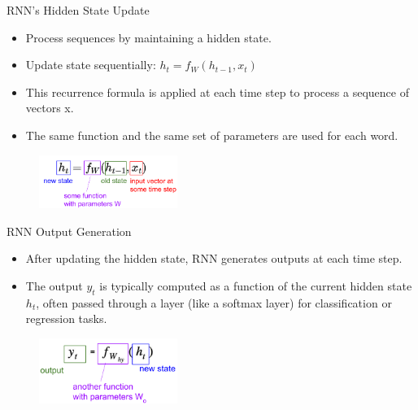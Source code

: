 \documentclass[serif, aspectratio=169]{beamer}
\begin{document}
\begin{frame}{RNN's Hidden State Update}
    \begin{itemize}
        \item Process sequences by maintaining a hidden state.
        \item Update state sequentially: $h_t = f_W(h_{t-1}, x_t)$
        \item This recurrence formula is applied at each time step to process a sequence of vectors x.
        \item The same function and the same set of parameters are used for each word.
        
    \end{itemize}
     \begin{figure}
         \centering
         \includegraphics[width=0.4\textwidth]{pic/RNN-2.png}
     \end{figure}
\end{frame}

\begin{frame}{RNN Output Generation}
	\begin{itemize}
		\item After updating the hidden state, RNN generates outputs at each time step.
		\item The output \( y_t \) is typically computed as a function of the current hidden state \( h_t \), often passed through a layer (like a softmax layer) for classification or regression tasks.
	\end{itemize}
	\begin{figure}
		\centering
		\includegraphics[width=0.4\textwidth]{pic/RNN-out.png}
	\end{figure}
\end{frame}
\end{document}
